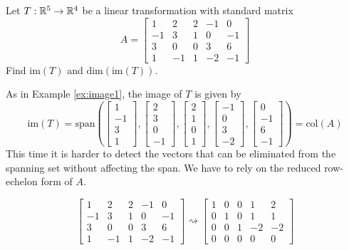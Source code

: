 \documentclass{ximera}
\begin{document}
\begin{example}\label{ex:image2}
Let $T:\mathbb{R}^5\rightarrow \mathbb{R}^4$ be a linear transformation with standard matrix $$A=\begin{bmatrix}1 & 2 & 2 &-1 & 0\\-1 & 3 & 1 & 0 & -1\\3 & 0 & 0 & 3 & 6\\ 1 & -1 & 1 & -2 & -1\end{bmatrix}$$
Find $\mbox{im}(T)$ and $\mbox{dim}(\mbox{im}(T))$.
\begin{explanation}
As in Example \ref{ex:image1}, the image of $T$ is given by
$$\mbox{im}(T)=\mbox{span}\left(\begin{bmatrix}1\\-1\\3\\1\end{bmatrix}, \begin{bmatrix}2\\3\\0\\-1\end{bmatrix}, \begin{bmatrix}2\\1\\0\\1\end{bmatrix}, \begin{bmatrix}-1\\0\\3\\-2\end{bmatrix}, \begin{bmatrix}0\\-1\\6\\-1\end{bmatrix}\right)=\mbox{col}(A)$$
This time it is harder to detect the vectors that can be eliminated from the spanning set without affecting the span.  We have to rely on the reduced row-echelon form of $A$.

$$\begin{bmatrix}1 & 2 & 2 &-1 & 0\\-1 & 3 & 1 & 0 & -1\\3 & 0 & 0 & 3 & 6\\ 1 & -1 & 1 & -2 & -1\end{bmatrix}  \rightsquigarrow \begin{bmatrix} 1 & 0 & 0 & 1 & 2\\0 & 1 & 0 & 1 & 1\\0 & 0 & 1 & -2 & -2\\ 0 & 0 & 0 & 0 & 0 \end{bmatrix}$$


\end{explanation}
\end{example}
\end{document}
